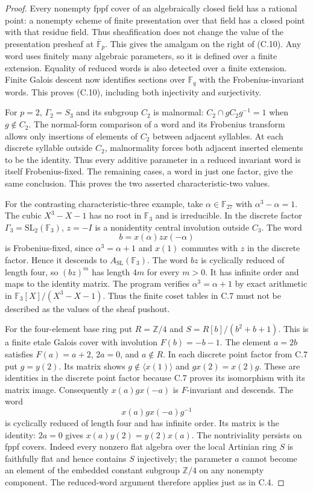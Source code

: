 \begin{proof}
Every nonempty fppf cover of an algebraically closed field has a
rational point: a nonempty scheme of finite presentation over that
field has a closed point with that residue field. Thus sheafification
does not change the value of the presentation presheaf at
$\overline{\mathbb F}_p$. This gives the amalgam on the right of
(C.10). Any word uses finitely many algebraic parameters, so it is
defined over a finite extension. Equality of reduced words is also
detected over a finite extension. Finite Galois descent now identifies
sections over $\mathbb F_q$ with the Frobenius-invariant words.
This proves (C.10), including both injectivity and surjectivity.

For $p=2$, $\Gamma_2=S_3$ and its subgroup $C_2$ is malnormal:
$C_2\cap gC_2g^{-1}=1$ when $g\notin C_2$. The normal-form
comparison of a word and its Frobenius transform allows only
insertions of elements of $C_2$ between adjacent syllables. At
each discrete syllable outside $C_2$, malnormality forces both
adjacent inserted elements to be the identity. Thus every additive
parameter in a reduced invariant word is itself Frobenius-fixed.
The remaining cases, a word in just one factor, give the same
conclusion. This proves the two asserted characteristic-two values.

For the contrasting characteristic-three example, take
$\alpha\in\mathbb F_{27}$ with $\alpha^3-\alpha=1$.
The cubic $X^3-X-1$ has no root in $\mathbb F_3$ and is
irreducible. In the discrete factor $\Gamma_3=\mathrm{SL}_2(\mathbb F_3)$,
$z=-I$ is a nonidentity central involution outside $C_3$.
The word
\[
 b=x(\alpha)z x(-\alpha)
\]
is Frobenius-fixed, since $\alpha^3=\alpha+1$ and $x(1)$
commutes with $z$ in the discrete factor. Hence it descends to
$A_{\mathrm{SL}}(\mathbb F_3)$. The word $bz$ is cyclically
reduced of length four, so $(bz)^m$ has length $4m$ for every
$m>0$. It has infinite order and maps to the identity matrix.
The program verifies $\alpha^3=\alpha+1$ by exact arithmetic
in $\mathbb F_3[X]/(X^3-X-1)$. Thus the finite coset tables
in C.7 must not be described as the values of the sheaf pushout.

For the four-element base ring put
$R=\mathbb Z/4$ and $S=R[b]/(b^2+b+1)$.
This is a finite etale Galois cover with involution
$F(b)=-b-1$. The element $a=2b$ satisfies $F(a)=a+2$,
$2a=0$, and $a\notin R$. In each discrete point factor
from C.7 put $g=y(2)$. Its matrix shows $g\notin\langle x(1)\rangle$
and $gx(2)=x(2)g$. These are identities in the discrete point
factor because C.7 proves its isomorphism with its matrix image.
Consequently $x(a)g x(-a)$ is $F$-invariant and descends.
The word
\[
 x(a)g x(-a)g^{-1}
\]
is cyclically reduced of length four and has infinite order.
Its matrix is the identity: $2a=0$ gives $x(a)y(2)=y(2)x(a)$.
The nontriviality persists on fppf covers. Indeed every nonzero
flat algebra over the local Artinian ring $S$ is faithfully flat
and hence contains $S$ injectively; the parameter $a$ cannot
become an element of the embedded constant subgroup $\mathbb Z/4$
on any nonempty component. The reduced-word argument therefore
applies just as in C.4.


\end{proof}
